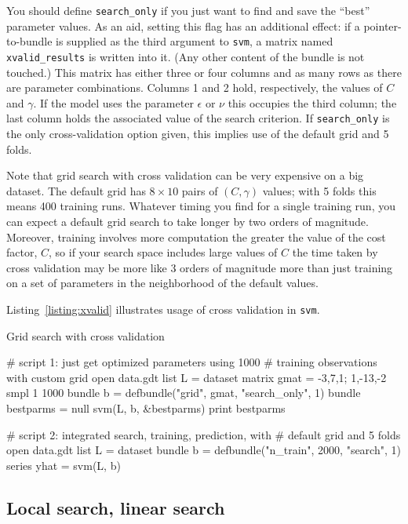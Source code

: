 \documentclass{article}
\begin{document}
You should define \texttt{search\_only} if you just want to find and
save the ``best'' parameter values. As an aid, setting this flag has
an additional effect: if a pointer-to-bundle is supplied as the third
argument to \texttt{svm}, a matrix named \texttt{xvalid\_results} is
written into it. (Any other content of the bundle is not touched.)
This matrix has either three or four columns and as many rows as there
are parameter combinations. Columns 1 and 2 hold, respectively, the
values of $C$ and $\gamma$.  If the model uses the parameter
$\epsilon$ or $\nu$ this occupies the third column; the last column
holds the associated value of the search criterion.  If
\texttt{search\_only} is the only cross-validation option given, this
implies use of the default grid and 5 folds.

Note that grid search with cross validation can be very expensive on a
big dataset. The default grid has $8 \times 10$ pairs of $(C, \gamma)$
values; with 5 folds this means 400 training runs. Whatever timing you
find for a single training run, you can expect a default grid search
to take longer by two orders of magnitude. Moreover, training involves
more computation the greater the value of the cost factor, $C$, so if
your search space includes large values of $C$ the time taken by cross
validation may be more like 3 orders of magnitude more than just
training on a set of parameters in the neighborhood of the default
values.

Listing~\ref{listing:xvalid} illustrates usage of cross validation in
\texttt{svm}.

\begin{script}[htbp]
  \caption{Grid search with cross validation}
  \label{listing:xvalid}
\begin{scode}
# script 1: just get optimized parameters using 1000
# training observations with custom grid
open data.gdt
list L = dataset
matrix gmat = {-3,7,1; 1,-13,-2}
smpl 1 1000
bundle b = defbundle("grid", gmat, "search_only", 1)
bundle bestparms = null
svm(L, b, &bestparms)
print bestparms

# script 2: integrated search, training, prediction, with
# default grid and 5 folds
open data.gdt
list L = dataset
bundle b = defbundle("n_train", 2000, "search", 1)
series yhat = svm(L, b)
\end{scode}
\end{script}

\subsection{Local search, linear search}
\label{sec:local-search}
\end{document}
